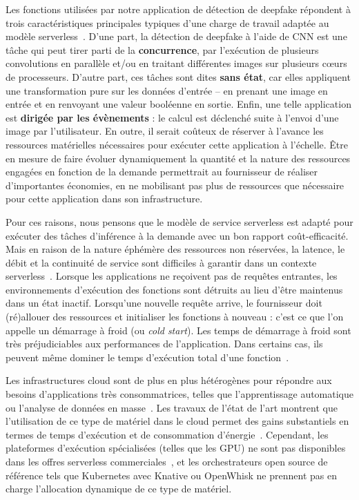 Les fonctions utilisées par notre application de détection de deepfake répondent à trois caractéristiques principales typiques d'une charge de travail adaptée au modèle serverless~\cite{cncf2018whitepaper}. D'une part, la détection de deepfake à l'aide de \gls{CNN} est une tâche qui peut tirer parti de la \textbf{concurrence}, par l'exécution de plusieurs convolutions en parallèle et/ou en traitant différentes images sur plusieurs cœurs de processeurs. D'autre part, ces tâches sont dites \textbf{sans état}, car elles appliquent une transformation pure sur les données d'entrée -- en prenant une image en entrée et en renvoyant une valeur booléenne en sortie. Enfin, une telle application est \textbf{dirigée par les évènements} : le calcul est déclenché suite à l'envoi d'une image par l'utilisateur.
En outre, il serait coûteux de réserver à l'avance les ressources matérielles nécessaires pour exécuter cette application à l'échelle. Être en mesure de faire évoluer dynamiquement la quantité et la nature des ressources engagées en fonction de la demande permettrait au fournisseur de réaliser d'importantes économies, en ne mobilisant pas plus de ressources que nécessaire pour cette application dans son infrastructure.

Pour ces raisons, nous pensons que le modèle de service serverless est adapté pour exécuter des tâches d'inférence à la demande avec un bon rapport coût-efficacité. Mais en raison de la nature éphémère des ressources non réservées, la latence, le débit et la continuité de service sont difficiles à garantir dans un contexte serverless~\cite{vaneykSPECRGCloud2018, dartoisCuckooOpportunisticMapReduce2019}. Lorsque les applications ne reçoivent pas de requêtes entrantes, les environnements d'exécution des fonctions sont détruits au lieu d'être maintenus dans un état inactif. Lorsqu'une nouvelle requête arrive, le fournisseur doit (ré)allouer des ressources et initialiser les fonctions à nouveau : c'est ce que l'on appelle un démarrage à froid (ou \textit{cold start}). Les temps de démarrage à froid sont très préjudiciables aux performances de l'application. Dans certains cas, ils peuvent même dominer le temps d'exécution total d'une fonction~\cite{mullerLambadaInteractiveData2020}.

Les infrastructures cloud sont de plus en plus hétérogènes pour répondre aux besoins d'applications très consommatrices, telles que l'apprentissage automatique ou l'analyse de données en masse~\cite{reissHeterogeneityDynamicityClouds}. Les travaux de l'état de l'art montrent que l'utilisation de ce type de matériel dans le cloud permet des gains substantiels en termes de temps d'exécution et de consommation d'énergie~\cite{10.1145/3369583.3392679, 9195730}. Cependant, les plateformes d'exécution spécialisées (telles que les \gls{GPU}) ne sont pas disponibles dans les offres serverless commerciales~\cite{khandelwalTaureauDeconstructingServerless2020}, et les orchestrateurs open source de référence tels que Kubernetes avec Knative ou OpenWhisk ne prennent pas en charge l'allocation dynamique de ce type de matériel.

